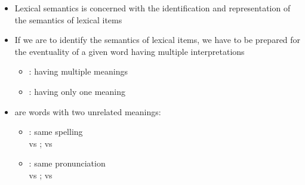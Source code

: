 \documentclass[headrule,footrule]{foils}
\begin{document}

\MyLogo

\begin{itemize}
\item Lexical semantics is concerned with the identification and
  representation of the semantics of lexical items
\item If we are to identify the semantics of lexical items, we have to
  be prepared for the eventuality of a given word having 
  multiple interpretations
  \begin{itemize}
  \item {}: having multiple meanings
  \item {}: having only one meaning
  \end{itemize}
\item {} are words with two unrelated meanings:
  \begin{itemize}
  \item {}: same spelling 
    \\  vs ;  vs 
  \item {}: same pronunciation
     \\  vs ;  vs 
  \end{itemize}

\end{itemize}












\end{document}
